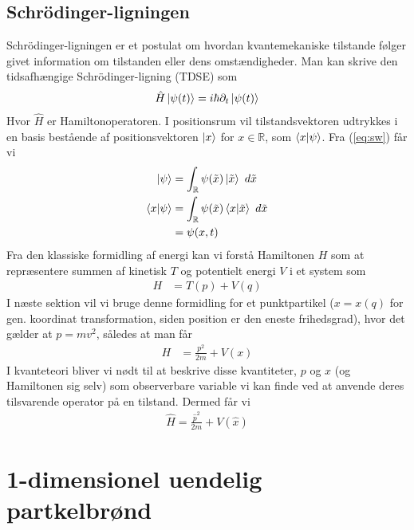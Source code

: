 \documentclass[12pt]{article}
\theoremstyle{definition}
\theoremstyle{remark}
\theoremstyle{definition}
\numberwithin{equation}{section}
\begin{document}
\subsection{Schrödinger-ligningen}
Schrödinger-ligningen er et postulat om hvordan kvantemekaniske tilstande følger givet information om tilstanden eller dens omstændigheder. Man kan skrive den tidsafhængige Schrödinger-ligning (TDSE) som
\begin{align}
  \label{eq:schr}
  \hat H \ket{\psi(t)} = i\hbar \partial_t \ket{\psi(t)}
\end{align}
Hvor $\hat H$ er Hamiltonoperatoren. 
I positionsrum vil tilstandsvektoren udtrykkes i en basis bestående af positionsvektoren ${\ket x}$ for $x\in \mathbb R$, som $\braket{x}{\psi}$. Fra (\ref{eq:sw}) får vi 
\begin{align*}
    \ket{\psi} &= \int_{\mathbb R} \psi(\tilde x)\ket{\tilde x}~d\tilde x \\
    \braket{x}{\psi} &= \int_{\mathbb R} \psi(\tilde x)\braket{x}{\tilde x}~d\tilde x \\
    &= \psi(x,t)
\end{align*}
Fra den klassiske formidling af energi kan vi forstå Hamiltonen $H$ som at repræsentere summen af kinetisk $T$ og potentielt energi $V$ i et system som
\begin{align}
    H &= T(p)+V(q)
\end{align}
I næste sektion vil vi bruge denne formidling for et punktpartikel ($x=x(q)$ for gen. koordinat transformation, siden position er den eneste frihedsgrad), hvor det gælder at $p=mv^2$, således at man får
\begin{align}
    H &= \frac{p^2}{2m} + V(x)
\end{align}
I kvanteteori bliver vi nødt til at beskrive disse kvantiteter, $p$ og $x$ (og Hamiltonen sig selv) som observerbare variable vi kan finde ved at anvende deres tilsvarende operator på en tilstand. Dermed får vi
\begin{align}
    \hat H = \frac{\hat p^2}{2m}+V(\hat x)
\end{align}

\newpage
\section{1-dimensionel uendelig partkelbrønd}
\end{document}

